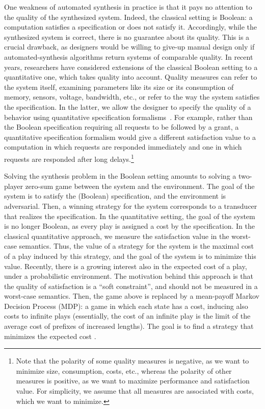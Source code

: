 \documentclass[runningheads,a4paper]{llncs}
\begin{document}
One weakness of automated synthesis in practice is that it pays no attention to the quality of the synthesized system. Indeed, the classical setting is Boolean: a computation satisfies a specification or does not satisfy it. Accordingly, while the synthesized system is correct, there is no guarantee about its quality. This is a crucial drawback, as designers would be willing to give-up manual design only if automated-synthesis algorithms return systems of comparable quality. 
In recent years, researchers have considered extensions of the classical Boolean setting to a quantitative one, which takes quality into account. Quality measures can refer to the system itself, examining parameters like its size or its consumption of memory, sensors, voltage, bandwidth, etc., or refer to the way the system satisfies the specification. In the latter, we allow the designer to specify the quality of a behavior using quantitative specification formalisms~\cite{ABK16,BMM14,AFHMS05}. 
For example, rather than the Boolean specification requiring all requests to be followed by a grant, a quantitative specification formalism would give a different satisfaction value to a computation in which requests are responded immediately and one in which requests are responded after long delays.\footnote{Note that the polarity of some quality measures is negative, as we want to minimize size, consumption, costs, etc., whereas the polarity of other measures is positive,  as we want to maximize performance and satisfaction value. For simplicity, we assume that all measures are associated with costs, which we want to minimize.}

Solving the synthesis problem in the Boolean setting amounts to solving a two-player zero-sum game between the system and the environment. The goal of the system is to satisfy the (Boolean) specification, and the environment is adversarial. Then, a winning strategy for the system corresponds to a transducer that realizes the specification. 
In the quantitative setting, the goal of the system is no longer Boolean, as every play is assigned a cost by the specification. In the classical quantitative approach, we measure the satisfaction value in the worst-case semantics. Thus, the value of a strategy for the system is the maximal cost of a play induced by this strategy, and the goal of the system is to minimize this value. Recently, there is a growing interest also in the expected cost of a play, under a probabilistic environment. The motivation behind this approach is that the quality of satisfaction is a ``soft constraint'', and should not be measured in a worst-case semantics. Then, the game above is replaced by a mean-payoff Markov Decision Process (MDP): a game in which each state has a cost, inducing also costs to infinite plays (essentially, the cost of an infinite play is the limit of the average cost of prefixes of increased lengths). The goal is to find a strategy that minimizes the expected cost \cite{CKK15,CR15}.
\end{document}
